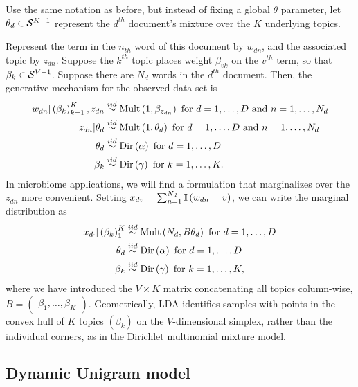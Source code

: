 \documentclass[oupdraft]{bio}
\begin{document}
Use the same notation as before, but instead of fixing a global $\theta$
parameter, let $\theta_{d} \in \mathcal{S}^{K - 1}$ represent the $d^{th}$
document's mixture over the $K$ underlying topics.

Represent the term in the $n_{th}$ word of this document
by $w_{dn}$, and the associated topic by $z_{dn}$. Suppose the $k^{th}$ topic
places weight $\beta_{vk}$ on the $v^{th}$ term, so that $\beta_{k} \in
\mathcal{S}^{V - 1}$. Suppose there are $N_{d}$ words in the $d^{th}$ document. Then,
the generative mechanism for the observed data set is
\begin{align*}
w_{dn} \vert \left(\beta_{k}\right)_{k = 1}^{K}, z_{dn} &\overset{iid}{\sim} \textnormal{Mult}\left(1, \beta_{z_{dn}}\right) \text{ for } d = 1, \dots, D  \text{ and } n = 1, \dots,  N_{d} \\
z_{dn} \vert \theta_{d} &\overset{iid}{\sim} \textnormal{Mult}\left(1, \theta_{d}\right) \text{ for } d = 1, \dots, D \text{ and } n = 1, \dots, N_{d}\\
\theta_{d} &\overset{iid}{\sim} \textnormal{Dir}\left(\alpha\right) \text{ for } d = 1, \dots, D \\
\beta_{k} &\overset{iid}{\sim} \textnormal{Dir}\left(\gamma\right) \text{ for } k = 1, \dots, K.
\end{align*}
In microbiome applications, we will find a formulation that marginalizes over
the $z_{dn}$ more convenient. Setting $x_{dv} = \sum_{n = 1}^{N_{d}}
\mathbb{I}\left({w_{dn} = v}\right)$, we can write the marginal distribution as
\begin{align*}
x_{d\cdot} \vert \left(\beta_{k}\right)_{1}^{K} &\overset{iid}{\sim} \textnormal{Mult}\left(N_{d}, B\theta_{d}\right) \text{ for } d = 1, \dots, D\\
\theta_{d} &\overset{iid}{\sim} \textnormal{Dir}\left(\alpha\right) \text{ for } d = 1, \dots, D \\
\beta_{k} &\overset{iid}{\sim} \textnormal{Dir}\left(\gamma\right) \text{ for }k = 1, \dots, K,
\end{align*}
where we have introduced the $V \times K$ matrix concatenating all topics
column-wise, $B = \begin{pmatrix}\beta_{1}, \dots, \beta_{K}\end{pmatrix}$.
Geometrically, LDA identifies samples with points in the convex hull of $K$
topics $\left(\beta_{k}\right)$ on the $V$-dimensional simplex, rather than the
individual corners, as in the Dirichlet multinomial mixture model.

\subsection{Dynamic Unigram model}
\end{document}
